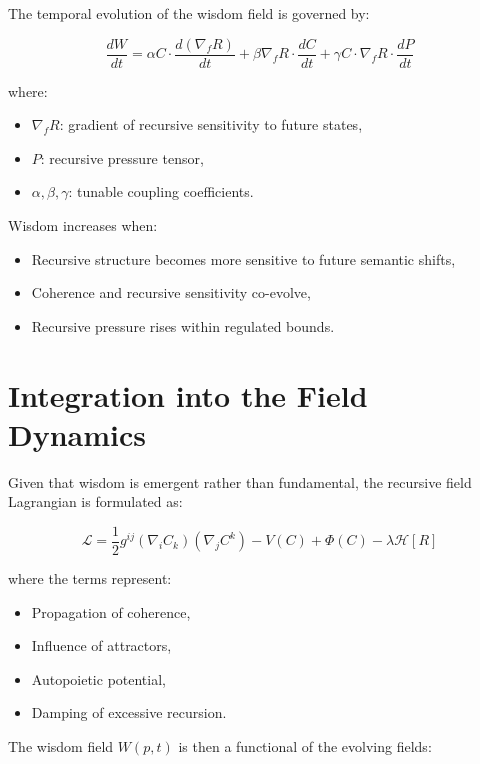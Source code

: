 The temporal evolution of the wisdom field is governed by:

\begin{equation}
\frac{dW}{dt} = \alpha C \cdot \frac{d(\nabla_f R)}{dt} + \beta \nabla_f R \cdot \frac{dC}{dt} + \gamma C \cdot \nabla_f R \cdot \frac{dP}{dt}
\end{equation}

where:
\begin{itemize}
    \item \(\nabla_f R\): gradient of recursive sensitivity to future states,
    \item \(P\): recursive pressure tensor,
    \item \(\alpha, \beta, \gamma\): tunable coupling coefficients.
\end{itemize}

Wisdom increases when:
\begin{itemize}
    \item Recursive structure becomes more sensitive to future semantic shifts,
    \item Coherence and recursive sensitivity co-evolve,
    \item Recursive pressure rises within regulated bounds.
\end{itemize}

\section{Integration into the Field Dynamics}

Given that wisdom is emergent rather than fundamental, the recursive field Lagrangian is formulated as:

\begin{equation}
\mathcal{L} = \frac{1}{2} g^{ij} (\nabla_i C_k)(\nabla_j C^k) - V(C) + \Phi(C) - \lambda \mathcal{H}[R]
\end{equation}

where the terms represent:
\begin{itemize}
    \item Propagation of coherence,
    \item Influence of attractors,
    \item Autopoietic potential,
    \item Damping of excessive recursion.
\end{itemize}

The wisdom field \(W(p, t)\) is then a functional of the evolving fields:

